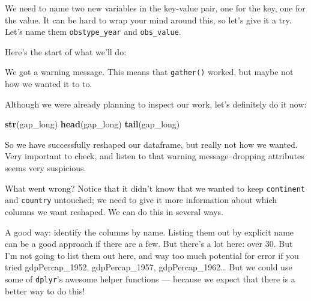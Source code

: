 \documentclass[]{book}
\newenvironment{Shaded}{\begin{snugshade}}{\end{snugshade}}
\newcommand{\KeywordTok}[1]{\textcolor[rgb]{0.13,0.29,0.53}{\textbf{#1}}}
\newcommand{\DataTypeTok}[1]{\textcolor[rgb]{0.13,0.29,0.53}{#1}}
\newcommand{\StringTok}[1]{\textcolor[rgb]{0.31,0.60,0.02}{#1}}
\newcommand{\OperatorTok}[1]{\textcolor[rgb]{0.81,0.36,0.00}{\textbf{#1}}}
\newcommand{\NormalTok}[1]{#1}
\theoremstyle{definition}
\theoremstyle{definition}
\theoremstyle{definition}
\theoremstyle{remark}
\begin{document}
We need to name two new variables in the key-value pair, one for the
key, one for the value. It can be hard to wrap your mind around this, so
let's give it a try. Let's name them \texttt{obstype\_year} and
\texttt{obs\_value}.

Here's the start of what we'll do:

\begin{Shaded}
\end{Shaded}

We got a warning message. This means that \texttt{gather()} worked, but
maybe not how we wanted it to to.

Although we were already planning to inspect our work, let's definitely
do it now:

\begin{Shaded}
\begin{Highlighting}[]
\KeywordTok{str}\NormalTok{(gap_long)}
\KeywordTok{head}\NormalTok{(gap_long)}
\KeywordTok{tail}\NormalTok{(gap_long)}
\end{Highlighting}
\end{Shaded}

So we have successfully reshaped our dataframe, but really not how we
wanted. Very important to check, and listen to that warning
message--dropping attributes seems very suspicious.

What went wrong? Notice that it didn't know that we wanted to keep
\texttt{continent} and \texttt{country} untouched; we need to give it
more information about which columns we want reshaped. We can do this in
several ways.

A good way: identify the columns by name. Listing them out by explicit
name can be a good approach if there are a few. But there's a lot here:
over 30. But I'm not going to list them out here, and way too much
potential for error if you tried gdpPercap\_1952, gdpPercap\_1957,
gdpPercap\_1962\ldots{} But we could use some of \texttt{dplyr}'s
awesome helper functions --- because we expect that there is a better
way to do this!
\end{document}
